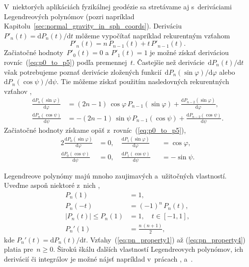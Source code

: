 \documentclass[a4paper, 12pt]{book}
\newcommand{\diff}{\mathrm d}
\begin{document}
V~niektorých aplikáciách fyzikálnej geodézie sa stretávame aj s~deriváciami 
Legendreových polynómov (pozri napríklad 
Kapitolu~\ref{sec:normal_gravity_in_sph_coords}).  Deriváciu~$P'_n(t) = \diff 
P_n(t) \slash \diff t$ môžeme vypočítať napríklad rekurentným vzťahom 
\parencite{Freeden2009}
%
\begin{equation}
P'_n(t) = n \, P_{n - 1}(t) + t \, P'_{n - 1}(t){.}
\end{equation}
%
Začiatočné hodnoty~$P'_0(t) = 0$ a $P'_1(t) = 1$ je možné získať deriváciou 
rovníc~(\ref{eq:p0_to_p5}) podľa premennej~$t$.  Častejšie než derivácie~$\diff 
P_n(t) \slash \diff t$ však potrebujeme poznať derivácie zložených 
funkcií~$\diff P_n(\sin\varphi) \slash \diff \varphi$ alebo~$\diff 
P_n(\cos\psi) \slash \diff \psi$.  Tie môžeme získať použitím nasledovných 
rekurentných vzťahov \parencite{Tscherning1976b},
%
\begin{align}
\label{eq:dlpsinphi_dphi}
\frac{\diff P_n(\sin\varphi)}{\diff \varphi} &= (2n - 1) \, \cos\varphi \, P_{n 
- 1}(\sin\varphi) + \frac{\diff P_{n - 2}(\sin\varphi)}{\diff \varphi}{,}\\
%
\label{eq:dlpcospsi_dpsi}
\frac{\diff P_n(\cos\psi)}{\diff \psi} &= -(2n - 1) \, \sin\psi \, P_{n 
- 1}(\cos\psi) + \frac{\diff P_{n - 2}(\cos\psi)}{\diff \psi}{.}
\end{align}
%
Začiatočné hodnoty získame opäť z~rovníc~(\ref{eq:p0_to_p5}),
%
\begin{alignat}{2}
\frac{\diff P_0(\sin\varphi)}{\diff \varphi} &= 0{,} \quad \frac{\diff 
P_1(\sin\varphi)}{\diff \varphi} &&= \cos\varphi{,}\\
%
\frac{\diff P_0(\cos\psi)}{\diff \psi} &= 0{,} \quad \frac{\diff 
P_1(\cos\psi)}{\diff \psi} &&= -\sin\psi{.}
\end{alignat}

Legendreove polynómy majú mnoho zaujimavých a~užitočných vlastností.  Uveďme 
aspoň niektoré z~nich \parencite{Freeden2009},
%
\begin{align}
\label{eq:pn_property1}
P_n(1) &= 1{,}\\
%
\label{eq:pn_property2}
P_n(-t) &= (-1)^n \, P_n(t){,}\\
%
\label{eq:pn_property3}
|P_n(t)| \leq P_n(1) &= 1{,} \quad t \in [-1, 1]{,}\\
%
\label{eq:pn_property4}
P_n'(1) &= \frac{n \, (n + 1)}{2}{,}
\end{align}
%
kde $P_n'(t) = \diff P_n(t) \slash \diff t$.  Vzťahy~(\ref{eq:pn_property1}) až
(\ref{eq:pn_property4}) platia pre~$n \geq 0$.   Širokú škálu ďalších
vlastností Legendreovych polynómov, ich derivácií či integrálov je možné nájsť
napríklad v~prácach \textcite{Gradshteyn2007}, \textcite{Freeden2009}
a~\textcite{Olver2010}.
\end{document}
